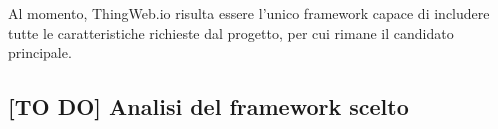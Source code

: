 \documentclass[12pt,a4paper,openright,oneside]{report}
\newcommand{\quotes}[1]{``#1''}
\begin{document}
Al momento, ThingWeb.io risulta essere l'unico framework capace di includere tutte le caratteristiche richieste dal progetto, per cui rimane il candidato principale.


\clearpage


\subsection{[TO DO] Analisi del framework scelto}

\end{document}
